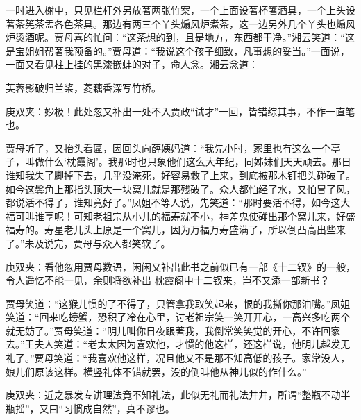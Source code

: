 \begin{parag}
    一时进入榭中，只见栏杆外另放著两张竹案，一个上面设著杯箸酒具，一个上头设著茶筅茶盂各色茶具。那边有两三个丫头煽风炉煮茶，这一边另外几个丫头也煽风炉烫酒呢。贾母喜的忙问：“这茶想的到，且是地方，东西都干净。”湘云笑道：“这是宝姐姐帮著我预备的。”贾母道：“我说这个孩子细致，凡事想的妥当。”一面说，一面又看见柱上挂的黑漆嵌蚌的对子，命人念。湘云念道：
\end{parag}


\begin{poem}
    \begin{pl}芙蓉影破归兰桨，菱藕香深写竹桥。\end{pl}
    \begin{note}庚双夹：妙极！此处忽又补出一处不入贾政“试才”一回，皆错综其事，不作一直笔也。\end{note}
\end{poem}


\begin{parag}
    贾母听了，又抬头看匾，因回头向薛姨妈道：“我先小时，家里也有这么一个亭子，叫做什么‘枕霞阁’。我那时也只象他们这么大年纪，同姊妹们天天顽去。那日谁知我失了脚掉下去，几乎没淹死，好容易救了上来，到底被那木钉把头碰破了。如今这鬓角上那指头顶大一块窝儿就是那残破了。众人都怕经了水，又怕冒了风，都说活不得了，谁知竟好了。”凤姐不等人说，先笑道：“那时要活不得，如今这大福可叫谁享呢！可知老祖宗从小儿的福寿就不小，神差鬼使碰出那个窝儿来，好盛福寿的。寿星老儿头上原是一个窝儿，因为万福万寿盛满了，所以倒凸高出些来了。”未及说完，贾母与众人都笑软了。\begin{note}庚双夹：看他忽用贾母数语，闲闲又补出此书之前似已有一部《十二钗》的一般，令人遥忆不能一见，余则将欲补出 枕霞阁中十二钗来，岂不又添一部新书？\end{note}贾母笑道：“这猴儿惯的了不得了，只管拿我取笑起来，恨的我撕你那油嘴。”凤姐笑道：“回来吃螃蟹，恐积了冷在心里，讨老祖宗笑一笑开开心，一高兴多吃两个就无妨了。”贾母笑道：“明儿叫你日夜跟著我，我倒常笑笑觉的开心，不许回家去。”王夫人笑道：“老太太因为喜欢他，才惯的他这样，还这样说，他明儿越发无礼了。”贾母笑道：“我喜欢他这样，况且他又不是那不知高低的孩子。家常没人，娘儿们原该这样。横竖礼体不错就罢，没的倒叫他从神儿似的作什么。”\begin{note}庚双夹：近之暴发专讲理法竟不知礼法，此似无礼而礼法井井，所谓“整瓶不动半瓶摇”，又曰“习惯成自然”，真不谬也。\end{note}
\end{parag}


